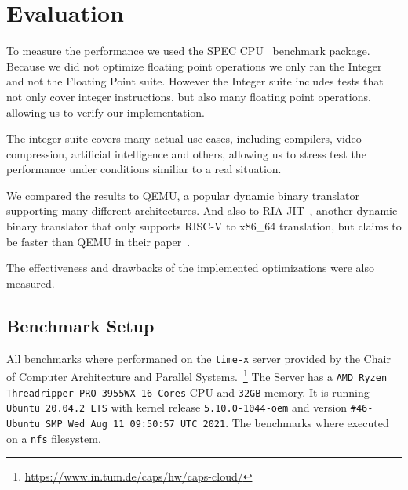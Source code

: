\documentclass[course=eragp]{aspdoc}
\begin{document}
\section{Evaluation}\label{sec:evaluation}

To measure the performance we used the SPEC CPU~\cite{spec_cpu_2017} benchmark package.
Because we did not optimize floating point operations we only ran the Integer and not the Floating Point suite.
However the Integer suite includes tests that not only cover integer instructions, but also many floating point operations, allowing us to verify our implementation.

\par

The integer suite covers many actual use cases, including compilers, video compression, artificial intelligence and others, allowing us to stress
test the performance under conditions similiar to a real situation.

\par

We compared the results to QEMU, a popular dynamic binary translator supporting many different architectures.
And also to RIA-JIT~\cite{ria_jit_repo}, another dynamic binary translator that only supports RISC-V to x86\_64 translation, but claims to be faster than QEMU in their paper~\cite{ria_jit_paper}.

\par

The effectiveness and drawbacks of the implemented optimizations were also measured.

\subsection{Benchmark Setup}

All benchmarks where performaned on the \texttt{time-x} server provided by the Chair of Computer Architecture and Parallel Systems.~\footnote{\url{https://www.in.tum.de/caps/hw/caps-cloud/}} %
The Server has a \texttt{AMD Ryzen Threadripper PRO 3955WX 16-Cores} CPU and \texttt{32GB} memory.
It is running \texttt{Ubuntu 20.04.2 LTS} with kernel release \texttt{5.10.0-1044-oem} and version \texttt{\#46-Ubuntu SMP Wed Aug 11 09:50:57 UTC 2021}.
The benchmarks where executed on a \texttt{nfs} filesystem.
\end{document}
